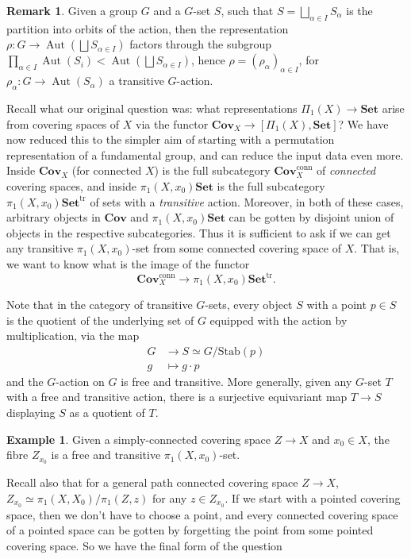 \documentclass{tufte-handout}
\def\Set {\mathbf{Set}}
\def\Cov {\mathbf{Cov}}
\DeclareMathOperator{\Aut}{Aut}
\theoremstyle{definition}
\newtheorem{example}{Example}
\newtheorem*{rem}{Remark}
\begin{document}
\begin{rem}
Given a group $G$ and a $G$-set $S$, such that $S=\bigsqcup_{\alpha\in I} S_\alpha$ is the partition into orbits of the action, then the representation $\rho \colon G\to \Aut(\bigsqcup S_{\alpha\in I})$ factors through the subgroup $\prod_{\alpha\in I} \Aut(S_i) < \Aut(\bigsqcup S_{\alpha\in I})$, hence $\rho = (\rho_\alpha)_{\alpha\in I}$, for $\rho_\alpha\colon G\to \Aut(S_\alpha)$ a transitive $G$-action.
\end{rem}

Recall what our original question was: what representations $\Pi_1(X)\to \Set$ arise from covering spaces of $X$ via the functor $\Cov_X \to [\Pi_1(X),\Set]$? We have now reduced this to the simpler aim of starting with a permutation representation of a fundamental group, and can reduce the input data even more. Inside $\Cov_X$ (for connected $X$) is the full subcategory $\Cov_X^\mathrm{conn}$ of \emph{connected} covering spaces, and inside $\pi_1(X,x_0)\Set$ is the full subcategory $\pi_1(X,x_0)\Set^\mathrm{tr}$ of sets with a \emph{transitive} action. Moreover, in both of these cases, arbitrary objects in $\Cov$ and $\pi_1(X,x_0)\Set$ can be gotten by disjoint union of objects in the respective subcategories. Thus it is sufficient to ask if we can get any transitive $\pi_1(X,x_0)$-set from some connected covering space of $X$. That is, we want to know what is the image of the functor
\[
	\Cov_X^\mathrm{conn} \longrightarrow  \pi_1(X,x_0)\Set^\mathrm{tr}.
\]

Note that in the category of transitive $G$-sets, every object $S$ with a point $p\in S$ is the quotient of the underlying set of $G$ equipped with the action by multiplication, via the map 
\begin{align*}
G& \to S \simeq G/\mathrm{Stab}(p)\\
g & \mapsto g\cdot p
\end{align*}
and the $G$-action on $G$ is free and transitive. More generally, given any $G$-set $T$ with a free and transitive action, there is a surjective equivariant map $T\to S$ displaying $S$ as a quotient of $T$.

\begin{example}
Given a simply-connected covering space $Z\to X$ and $x_0\in X$, the fibre $Z_{x_0}$ is a free and transitive $\pi_1(X,x_0)$-set.
\end{example}

Recall also that for a general path connected covering space $Z\to X$, $Z_{x_0} \simeq \pi_1(X,X_0)/\pi_1(Z,z)$ for any $z\in Z_{x_0}$. If we start with a pointed covering space, then we don't have to choose a point, and every connected covering space of a pointed space can be gotten by forgetting the point from some pointed covering space.
So we have the final form of the question
\end{document}
